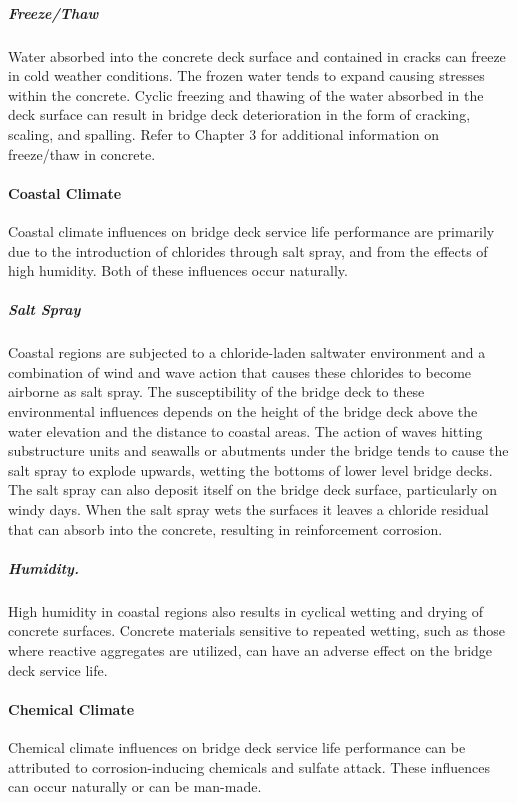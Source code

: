 \subparagraph*{Freeze/Thaw}
Water absorbed into the concrete deck surface and contained in cracks can freeze in cold weather conditions. The frozen water tends to expand causing stresses within the concrete. Cyclic freezing and thawing of the water absorbed in the deck surface can result in bridge deck deterioration in the form of cracking, scaling, and spalling. Refer to Chapter 3 for additional information on freeze/thaw in concrete.

\paragraph{Coastal Climate}
Coastal climate influences on bridge deck service life performance are primarily due to the introduction of
chlorides through salt spray, and from the effects of high humidity. Both of these influences occur naturally.

\subparagraph*{Salt Spray}
Coastal regions are subjected to a chloride-laden saltwater environment and a combination of wind
and wave action that causes these chlorides to become airborne as salt spray. The susceptibility of the bridge deck to
these environmental influences depends on the height of the bridge deck above the water elevation and the distance
to coastal areas. The action of waves hitting substructure units and seawalls or abutments under the bridge tends to
cause the salt spray to explode upwards, wetting the bottoms of lower level bridge decks. The salt spray can also
deposit itself on the bridge deck surface, particularly on windy days. When the salt spray wets the surfaces it leaves a
chloride residual that can absorb into the concrete, resulting in reinforcement corrosion.

\subparagraph*{Humidity.}
High humidity in coastal regions also results in cyclical wetting and drying of concrete surfaces.
Concrete materials sensitive to repeated wetting, such as those where reactive aggregates are utilized, can have an
adverse effect on the bridge deck service life.

\paragraph{Chemical Climate}
Chemical climate influences on bridge deck service life performance can be attributed to corrosion-inducing
chemicals and sulfate attack. These influences can occur naturally or can be man-made.

